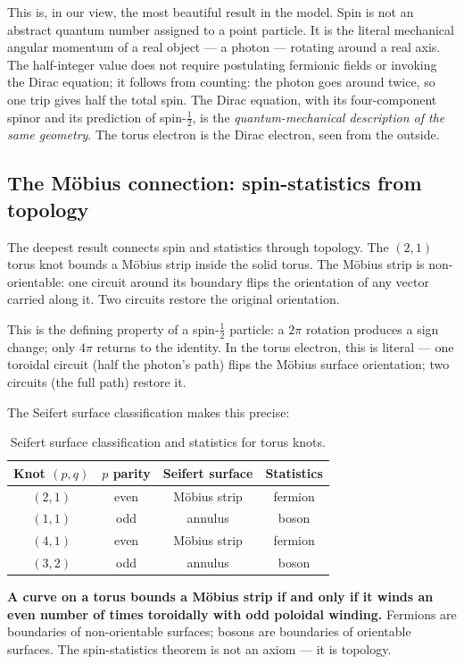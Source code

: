 \documentclass[11pt,a4paper]{article}
\begin{document}
This is, in our view, the most beautiful result in the model. Spin is not an abstract quantum number assigned to a point particle. It is the literal mechanical angular momentum of a real object --- a photon --- rotating around a real axis. The half-integer value does not require postulating fermionic fields or invoking the Dirac equation; it follows from counting: the photon goes around twice, so one trip gives half the total spin. The Dirac equation, with its four-component spinor and its prediction of spin-$\tfrac{1}{2}$, is the \emph{quantum-mechanical description of the same geometry}. The torus electron is the Dirac electron, seen from the outside.

\subsection{The M\"obius connection: spin-statistics from topology}

The deepest result connects spin and statistics through topology. The $(2,1)$ torus knot bounds a M\"obius strip inside the solid torus. The M\"obius strip is non-orientable: one circuit around its boundary flips the orientation of any vector carried along it. Two circuits restore the original orientation.

This is the defining property of a spin-$\tfrac{1}{2}$ particle: a $2\pi$ rotation produces a sign change; only $4\pi$ returns to the identity. In the torus electron, this is literal --- one toroidal circuit (half the photon's path) flips the M\"obius surface orientation; two circuits (the full path) restore it.

The Seifert surface classification makes this precise:

\begin{table}[h]
\centering
\begin{tabular}{@{}cccc@{}}
\toprule
Knot $(p,q)$ & $p$ parity & Seifert surface & Statistics \\
\midrule
$(2,1)$ & even & M\"obius strip & fermion \\
$(1,1)$ & odd & annulus & boson \\
$(4,1)$ & even & M\"obius strip & fermion \\
$(3,2)$ & odd & annulus & boson \\
\bottomrule
\end{tabular}
\caption{Seifert surface classification and statistics for torus knots.}
\label{tab:seifert}
\end{table}

\textbf{A curve on a torus bounds a M\"obius strip if and only if it winds an even number of times toroidally with odd poloidal winding.} Fermions are boundaries of non-orientable surfaces; bosons are boundaries of orientable surfaces. The spin-statistics theorem is not an axiom --- it is topology.
\end{document}
